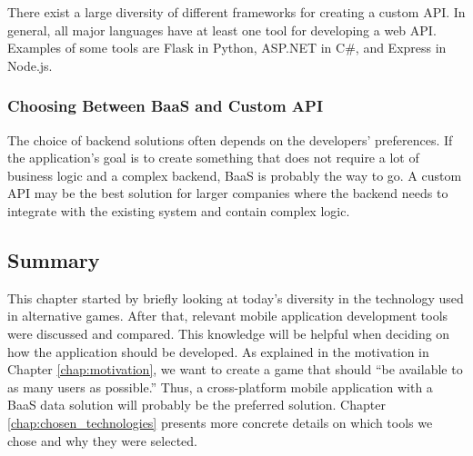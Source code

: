 There exist a large diversity of different frameworks for creating a custom API. In general, all major languages have at least one tool for developing a web API. Examples of some tools are Flask in Python, ASP.NET in C\#, and Express in Node.js.

\subsubsection{Choosing Between BaaS and Custom API}
The choice of backend solutions often depends on the developers’ preferences. If the application’s goal is to create something that does not require a lot of business logic and a complex backend, BaaS is probably the way to go. A custom API may be the best solution for larger companies where the backend needs to integrate with the existing system and contain complex logic.

\subsection{Summary}
This chapter started by briefly looking at today’s diversity in the technology used in alternative games. After that, relevant mobile application development tools were discussed and compared. This knowledge will be helpful when deciding on how the application should be developed. As explained in the motivation in Chapter \ref{chap:motivation}, we want to create a game that should “be available to as many users as possible.” Thus, a cross-platform mobile application with a BaaS data solution will probably be the preferred solution. Chapter \ref{chap:chosen_technologies} presents more concrete details on which tools we chose and why they were selected.